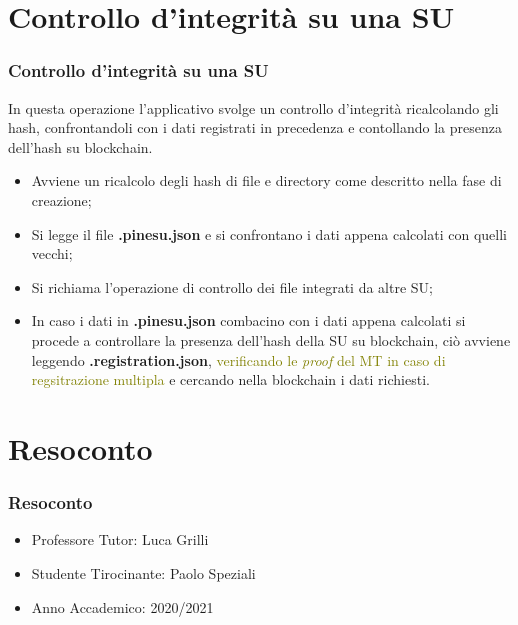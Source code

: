 \documentclass{beamer}
\begin{document}
\section{Controllo d'integrità su una SU}
\begin{frame}
	\frametitle{Controllo d'integrità su una SU}
	In questa operazione l'applicativo svolge un controllo d'integrità ricalcolando gli hash, confrontandoli con i dati registrati in precedenza e contollando la presenza dell'hash su blockchain.
	\begin{itemize}
		\item Avviene un ricalcolo degli hash di file e directory come descritto nella fase di creazione;
		\item Si legge il file \textbf{.pinesu.json} e si confrontano i dati appena calcolati con quelli vecchi;
		\item Si richiama l'operazione di controllo dei file integrati da altre SU;
		\item In caso i dati in \textbf{.pinesu.json} combacino con i dati appena calcolati si procede a controllare la presenza dell'hash della SU su blockchain, ciò avviene leggendo \textbf{.registration.json}, \textcolor{olive}{verificando le \emph{proof} del MT in caso di regsitrazione multipla} e cercando nella blockchain i dati richiesti.
	\end{itemize}
\end{frame}

\section{Resoconto}
\begin{frame}
	\frametitle{Resoconto}
	\begin{itemize}
  		\item Professore Tutor: Luca Grilli
  		\item Studente Tirocinante: Paolo Speziali
  		\item Anno Accademico: 2020/2021
	\end{itemize}
\end{frame}
\end{document}

